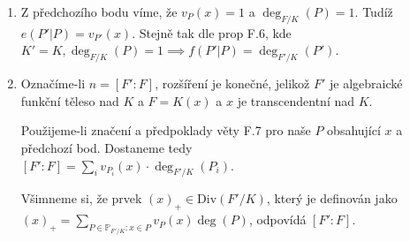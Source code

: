 \documentclass[12pt, a4paper]{article}
\begin{document}
\begin{enumerate}[label=(\alph*)]
    \item Z předchozího bodu víme, že $v_P(x)=1$ a $\deg_{F/K}(P)=1$. Tudíž $e(P'|P)=v_{P'}(x)$. Stejně tak dle prop F.6, kde $K'=K, \deg_{F/K}(P)=1 \implies f(P'|P)=\deg_{F'/K}(P')$.
    \item Označíme-li $n = [F':F]$, rozšíření je konečné, jelikož $F'$ je algebraické funkční těleso nad $K$ a $F=K(x)$ a $x$ je transcendentní nad $K$.

    Použijeme-li značení a předpoklady věty F.7 pro naše $P$ obsahující $x$ a předchozí bod. Dostaneme tedy \\$[F':F]=\sum_i v_{P_i}(x)\cdot \deg_{F'/K}(P_i)$.

    Všimneme si, že prvek $(x)_+ \in \text{Div}(F'/K)$, který je definován jako\\ $(x)_+ = \sum\limits_{P \in \mathbb{P}_{F'/K}:x \in P} v_P(x)\deg(P)$, odpovídá $[F':F]$. 
\end{enumerate}
\end{document}
